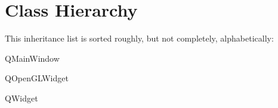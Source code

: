 \section{Class Hierarchy}
This inheritance list is sorted roughly, but not completely, alphabetically\+:\begin{DoxyCompactList}
\item {}
\item {}
\item {}
\item {}
\item Q\+Main\+Window\begin{DoxyCompactList}
\item {}
\end{DoxyCompactList}
\item Q\+Open\+G\+L\+Widget\begin{DoxyCompactList}
\item {}
\end{DoxyCompactList}
\item Q\+Widget\begin{DoxyCompactList}
\item {}
\end{DoxyCompactList}
\item {}
\end{DoxyCompactList}
